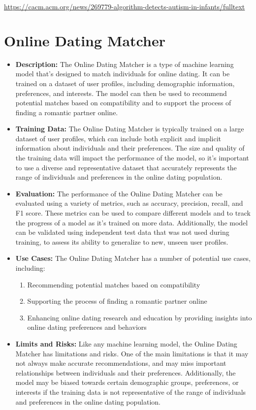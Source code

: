 \url{https://cacm.acm.org/news/269779-algorithm-detects-autism-in-infants/fulltext}

\section{Online Dating Matcher}

\begin{itemize}
    \item \textbf{Description:} The Online Dating Matcher is a type of machine learning model that's designed to match individuals for online dating. It can be trained on a dataset of user profiles, including demographic information, preferences, and interests. The model can then be used to recommend potential matches based on compatibility and to support the process of finding a romantic partner online.
    \item \textbf{Training Data:} The Online Dating Matcher is typically trained on a large dataset of user profiles, which can include both explicit and implicit information about individuals and their preferences. The size and quality of the training data will impact the performance of the model, so it's important to use a diverse and representative dataset that accurately represents the range of individuals and preferences in the online dating population.
    \item \textbf{Evaluation:} The performance of the Online Dating Matcher can be evaluated using a variety of metrics, such as accuracy, precision, recall, and F1 score. These metrics can be used to compare different models and to track the progress of a model as it's trained on more data. Additionally, the model can be validated using independent test data that was not used during training, to assess its ability to generalize to new, unseen user profiles.
    \item \textbf{Use Cases:} The Online Dating Matcher has a number of potential use cases, including:
        \begin{enumerate}  
            \item Recommending potential matches based on compatibility
            \item Supporting the process of finding a romantic partner online
            \item Enhancing online dating research and education by providing insights into online dating preferences and behaviors
        \end{enumerate}
    \item \textbf{Limits and Risks:} Like any machine learning model, the Online Dating Matcher has limitations and risks. One of the main limitations is that it may not always make accurate recommendations, and may miss important relationships between individuals and their preferences. Additionally, the model may be biased towards certain demographic groups, preferences, or interests if the training data is not representative of the range of individuals and preferences in the online dating population.

\end{itemize}
